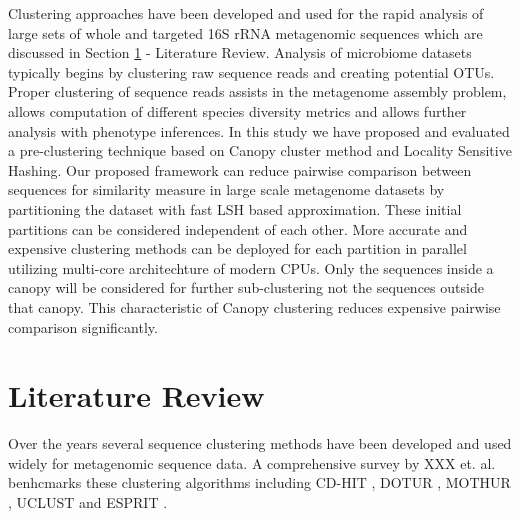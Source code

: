 \documentclass[10pt, conference, compsocconf]{IEEEtran}
\begin{document}
Clustering approaches have been developed and used for the rapid analysis of large sets of whole and targeted 16S rRNA metagenomic sequences which are discussed in Section \ref{sec:1} - Literature Review. Analysis of microbiome datasets typically begins by clustering raw sequence reads and creating potential OTUs. Proper clustering of sequence reads assists in the metagenome assembly problem, allows computation of different species diversity metrics and allows further analysis with phenotype inferences. In this study we have proposed and evaluated a pre-clustering technique based on Canopy cluster method and Locality Sensitive Hashing. Our proposed framework can reduce pairwise comparison between sequences for similarity measure in large scale metagenome datasets by partitioning the dataset with fast LSH based approximation. These initial partitions can be considered independent of each other. More accurate and expensive clustering methods can be deployed for each partition in parallel utilizing multi-core architechture of modern CPUs. Only the sequences inside a canopy will be considered for further sub-clustering not the sequences outside that canopy. This characteristic of Canopy clustering reduces expensive pairwise comparison significantly.       



\section{Literature Review}
\label{sec:1}


Over the years several sequence clustering methods have been developed 
and used widely for metagenomic sequence data. A comprehensive 
survey by XXX et. al. \cite{xxx} benhcmarks these clustering algorithms  including 
CD-HIT \cite{MARCDhit}, DOTUR \cite{MARDOTUR}, MOTHUR \cite{MARMothur}, UCLUST \cite{xx} 
and ESPRIT \cite{MAREspirit}. 
\end{document}
